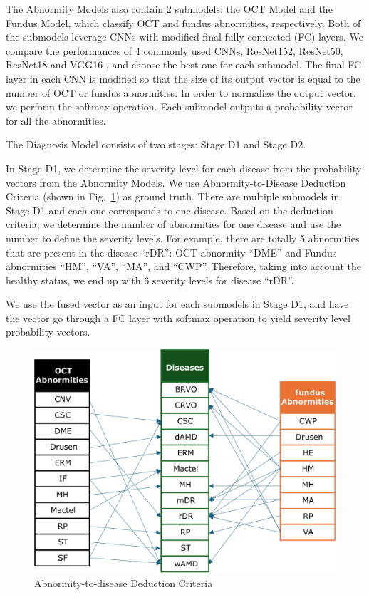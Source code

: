 \documentclass{article}
\begin{document}
	\begin{multicols}{2}
		
	The Abnormity Models also contain 2 submodels: the OCT Model and the Fundus Model, which classify OCT and fundus abnormities, respectively. Both of the submodels leverage CNNs with modified final fully-connected (FC) layers. We compare the performances of 4 commonly used CNNs, ResNet152, ResNet50, ResNet18 \autocite{He_Zhang_Ren_Sun_2016} and VGG16 \autocite{Simonyan_Zisserman_2015}, and choose the best one for each submodel. The final FC layer in each CNN is modified so that the size of its output vector is equal to the number of OCT or fundus abnormities. In order to normalize the output vector, we perform the softmax operation. Each submodel outputs a probability vector for all the abnormities.
	
	\vspace{0.5cm}
	
	The Diagnosis Model consists of two stages: Stage D1 and Stage D2. 
	
	\vspace{0.2cm}
	
	In Stage D1, we determine the severity level for each disease from the probability vectors from the Abnormity Models. We use Abnormity-to-Disease Deduction Criteria (shown in Fig.~\ref{fig:criteria}) as ground truth. There are multiple submodels in Stage D1 and each one corresponds to one disease. Based on the deduction criteria, we determine the number of abnormities for one disease and use the number to define the severity levels. For example, there are totally 5 abnormities that are present in the disease ``rDR'': OCT abnormity ``DME'' and Fundus abnormities ``HM'', ``VA'', ``MA'', and ``CWP''. Therefore, taking into account the healthy status, we end up with 6 severity levels for disease ``rDR''.

	We use the fused vector as an input for each submodels in Stage D1, and have the vector go through a FC layer with softmax operation to yield severity level probability vectors.
	
	\end{multicols}
	
	\begin{figure}[htbp]
		\centering
		\includegraphics[width=0.7\linewidth]{Figs/criteria.pdf}
		\caption{Abnormity-to-disease Deduction Criteria}
		\vspace{0.3cm}
		\label{fig:criteria}
	\end{figure}
\end{document}
